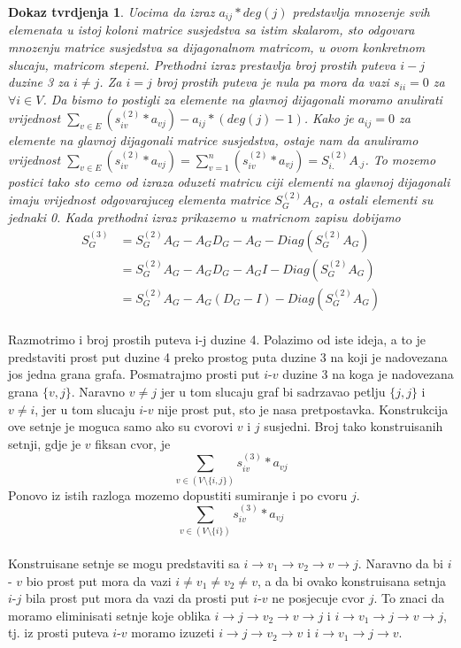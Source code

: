 \documentclass[11pt]{article}
\newtheorem*{custom_proof}{Dokaz tvrdjenja}
\begin{document}
\begin{custom_proof}
			Uocima da izraz $a_{ij} * deg(j)$ predstavlja mnozenje svih elemenata u istoj koloni matrice susjedstva sa istim skalarom, sto odgovara mnozenju matrice susjedstva sa dijagonalnom matricom, 
			u ovom konkretnom slucaju, matricom stepeni.
			Prethodni izraz prestavlja broj prostih puteva $i-j$ duzine 3 za $i \neq j$. Za $i = j$ broj prostih puteva je nula pa mora da vazi $s_{ii} = 0$ za $\forall i \in V$. 
			Da bismo to postigli za elemente na glavnoj dijagonali moramo anulirati vrijednost $\sum_{v \in E} (s_{iv}^{(2)} * a_{vj}) - a_{ij} * (deg(j)  - 1)$.
			Kako je $a_{ij} = 0$ za elemente na glavnoj dijagonali matrice susjedstva, ostaje nam da anuliramo vrijednost $\sum_{v \in E} (s_{iv}^{(2)}*a_{vj}) = \sum_{v = 1}^{n} (s_{iv}^{(2)}*a_{vj}) = S_{i.}^{(2)} A_{.j}$.
			To mozemo postici tako sto cemo od izraza oduzeti matricu ciji elementi na glavnoj dijagonali imaju vrijednost odgovarajuceg elementa matrice $S_G^{(2)} A_G$, a ostali elementi su jednaki 0.
			Kada prethodni izraz prikazemo u matricnom zapisu dobijamo
			\[
				\begin{split}
				S_G^{(3)} & = S_G^{(2)} A_G - A_G D_G - A_G  - Diag(S_G^{(2)} A_G) \\
					      & = S_G^{(2)} A_G - A_G D_G - A_G I - Diag(S_G^{(2)} A_G)  \\
					      & = S_G^{(2)} A_G - A_G (D_G - I) - Diag(S_G^{(2)} A_G)
				\end{split}
			\]
			\end{custom_proof}
	
			\paragraph{}
			Razmotrimo i broj prostih puteva i-j duzine 4. Polazimo od iste ideja, a to je predstaviti prost put duzine 4 preko prostog puta duzine 3 na koji je nadovezana jos jedna grana grafa.
			Posmatrajmo prosti put $i$-$v$ duzine 3 na koga je nadovezana grana $\{v,j\}$. Naravno $v \neq j$ jer u tom slucaju graf bi sadrzavao petlju $\{j,j\}$ i $v \neq i$, jer u tom slucaju $i$-$v$ nije prost put, 
			sto je nasa pretpostavka.  Konstrukcija ove setnje je moguca samo ako su cvorovi $v$ i $j$ susjedni. Broj tako konstruisanih setnji, gdje je $v$ fiksan cvor, je
			\[
				\sum_{v \in  (V \setminus \{i,j\})} s_{iv}^{(3)} * a_{vj}
			\]
			Ponovo iz istih razloga mozemo dopustiti sumiranje i po cvoru $j$.
			\[
				\sum_{v \in (V \setminus \{i\})} s_{iv}^{(3)} * a_{vj}
			\]
			\paragraph{}
			Konstruisane setnje se mogu predstaviti sa $i \rightarrow v_1 \rightarrow v_2 \rightarrow v \rightarrow j$. Naravno da bi $i$ - $v$ bio prost put mora da vazi $i \neq v_1 \neq v_2 \neq v$,
			a da bi ovako konstruisana setnja $i$-$j$ bila prost put mora da vazi da prosti put $i$-$v$ ne posjecuje cvor $j$.
			To znaci da moramo eliminisati setnje koje oblika $i \rightarrow j \rightarrow v_2 \rightarrow v \rightarrow j$ i $i \rightarrow v_1 \rightarrow j \rightarrow v \rightarrow j$, tj. iz prosti puteva $i$-$v$ moramo izuzeti 
			$i \rightarrow j \rightarrow v_2 \rightarrow v$ i $i \rightarrow v_1 \rightarrow j \rightarrow v$.
		
\end{document}
